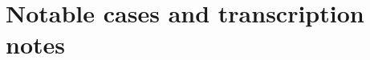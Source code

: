 \documentclass[11pt]{article}
\begin{document}






\section{Notable cases and transcription notes}
\label{sec:notes}
\end{document}
